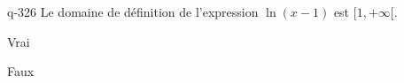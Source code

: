 \begin{truefalse}{q-326}
Le domaine de définition de l'expression $\ln(x-1)$ est $[1,+\infty[$.
\item Vrai
\item* Faux
\end{truefalse}

